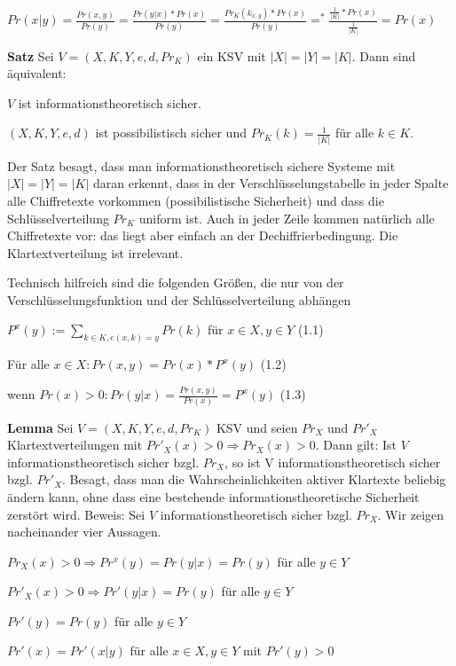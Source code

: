 \documentclass[a4paper]{article}
\begin{document}
\begin{multicols}{3}
    $Pr(x|y) =\frac{Pr(x,y)}{Pr(y)}=\frac{Pr(y|x)*Pr(x)}{Pr(y)}=\frac{Pr_K(k_{x,y})*Pr(x)}{Pr(y)}=^* \frac{\frac{1}{|K|}*Pr(x)}{\frac{1}{|K|}}=Pr(x)$

    \textbf{Satz} Sei $V= (X,K,Y,e,d,Pr_K)$ ein KSV mit $|X|=|Y|=|K|$. Dann sind äquivalent:
    \begin{enumerate*}
        \item $V$ ist informationstheoretisch sicher.
        \item $(X,K,Y,e,d)$ ist possibilistisch sicher und $Pr_K(k)=\frac{1}{|K|}$ für alle $k\in K$.
    \end{enumerate*}

    Der Satz besagt, dass man informationstheoretisch sichere Systeme mit $|X|=|Y|=|K|$ daran erkennt, dass in der Verschlüsselungstabelle in jeder Spalte alle Chiffretexte vorkommen (possibilistische Sicherheit) und dass die Schlüsselverteilung $Pr_K$ uniform ist. Auch in jeder Zeile kommen natürlich alle Chiffretexte vor: das liegt aber einfach an der Dechiffrierbedingung. Die Klartextverteilung ist irrelevant.

    Technisch hilfreich sind die folgenden Größen, die nur von der Verschlüsselungsfunktion und der Schlüsselverteilung abhängen
    \begin{itemize*}
        \item $P^x(y):=\sum_{k\in K, e(x,k)=y} Pr(k)$ für $x\in X,y\in Y$ (1.1)
        \item Für alle $x\in X:Pr(x,y) = Pr(x)*P^x(y)$ (1.2)
        \item wenn $Pr(x)> 0:Pr(y|x) = \frac{Pr(x,y)}{Pr(x)}=P^x(y)$ (1.3)
    \end{itemize*}

    \textbf{Lemma} Sei $V=(X,K,Y,e,d,Pr_K)$ KSV und seien $Pr_X$ und $Pr'_X$ Klartextverteilungen mit $Pr'_X(x)>0\Rightarrow Pr_X(x)>0$. Dann gilt: Ist $V$ informationstheoretisch sicher bzgl. $Pr_X$, so ist V informationstheoretisch sicher bzgl. $Pr'_X$. Besagt, dass man die Wahrscheinlichkeiten aktiver Klartexte beliebig ändern kann, ohne dass eine bestehende informationstheoretische Sicherheit zerstört wird.
    Beweis: Sei $V$ informationstheoretisch sicher bzgl. $Pr_X$. Wir zeigen nacheinander vier Aussagen.
    \begin{enumerate*}
        \item $Pr_X(x)> 0 \Rightarrow Pr^x(y) = Pr(y|x) = Pr(y)$ für alle $y\in Y$
        \item $Pr'_X(x)> 0 \Rightarrow Pr'(y|x) = Pr(y)$ für alle $y\in Y$
        \item $Pr'(y)=Pr(y)$ für alle $y\in Y$
        \item $Pr'(x)=Pr'(x|y)$ für alle $x\in X,y\in Y$ mit $Pr'(y)>0$
    \end{enumerate*}


\end{multicols}
\end{document}
